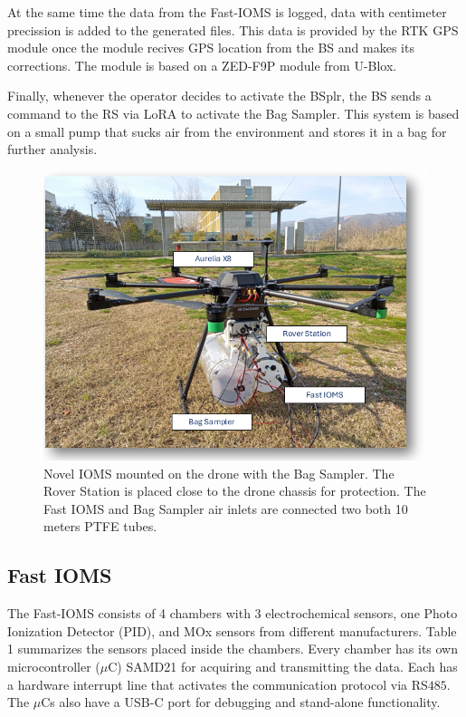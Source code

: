 \documentclass[lettersize,journal]{IEEEtran}
\begin{document}
At the same time the data from the Fast-IOMS is logged, data with centimeter precission is added to the generated files. This data is provided by the RTK GPS module once the module recives GPS location from the BS and makes its corrections. The module is based on a ZED-F9P module from U-Blox.

Finally, whenever the operator decides to activate the BSplr, the BS sends a command to the RS via LoRA to activate the Bag Sampler. This system is based on a small pump that sucks air from the environment and stores it in a bag for further analysis.

\begin{figure}[!t] %
	\centering
	\includegraphics[width=1\linewidth]{./images/fig3.png}
	\hfill
	\caption{Novel IOMS mounted on the drone with the Bag Sampler. The Rover Station is placed close to the drone chassis for protection. The Fast IOMS and Bag Sampler air inlets are connected two both 10 meters PTFE tubes.}
	\label{fig:iomsPhoto}
\end{figure}

\subsection{Fast IOMS}
\label{ssec:fastIOMS}
The Fast-IOMS consists of 4 chambers with 3 electrochemical sensors, one Photo Ionization Detector (PID), and MOx sensors from different manufacturers. Table 1 summarizes the sensors placed inside the chambers.
Every chamber has its own microcontroller ($\mu$C) SAMD21 for acquiring and transmitting the data. Each has a hardware interrupt line that activates the communication protocol via RS$485$. The $\mu$Cs also have a USB-C port for debugging and stand-alone functionality.
\end{document}
